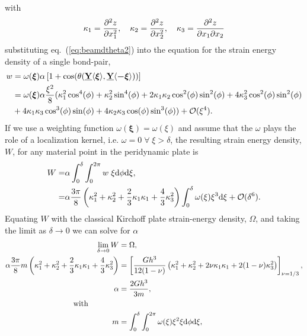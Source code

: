 \documentclass[preprint,review,12pt]{elsarticle}
\newcommand\vstate[3]{%
	\mathbf{\underline{#1}}%
	\ifstrempty{#2}{}{[#2]}%
	\ifstrempty{#3}{}{\langle #3 \rangle}}
\begin{document}
%
with
%
\begin{equation}
    \kappa_1=\frac{\partial^2 z}{\partial x_1^2}, \quad \kappa_2= \frac{\partial^2 z}{\partial x_2^2}, \quad \kappa_3=\frac{\partial^2 z}{\partial x_1\partial x_2}\notag
\end{equation}
%
substituting eq.~(\ref{eq:beamdtheta2}) into the equation for the strain energy density of a single bond-pair,
%
\begin{align}
    w &= \omega(\boldsymbol{\xi}) \alpha \left[1+\cos(\theta(\vstate{Y}{}{\boldsymbol{\xi}},\vstate{Y}{}{\boldsymbol{-\xi}}) ) \right] \notag \\
    &= \omega(\boldsymbol{\xi}) \alpha\frac{\xi^2}{8}(\kappa_1^2\cos^4(\phi)+\kappa_2^2\sin^4(\phi)+2\kappa_1\kappa_2\cos^2(\phi)\sin^2(\phi)+4\kappa_3^2\cos^2(\phi)\sin^2(\phi) \notag \\
    &+ 4\kappa_1\kappa_3\cos^3(\phi)\sin(\phi)+4\kappa_2\kappa_3\cos(\phi)\sin^3(\phi))+\mathcal{O}(\xi^4).\notag
\end{align}
%
If we use a weighting function \(\omega(\boldsymbol{\xi})=\omega(\xi)\) and assume that the $\omega$ plays the role of a localization kernel, i.e. $\omega = 0 \; \forall \; \xi > \delta$, the resulting strain energy density, $W$, for any material point in the peridynamic plate is
%
\begin{align}
    W =& \alpha \int_{0}^\delta\int_0^{2 \pi} w\; \xi {\rm d}\phi {\rm d}\xi ,\notag \\
    =& \alpha \frac{3\pi}{8} \left(\kappa_1^2+\kappa_2^2+\frac{2}{3}\kappa_1\kappa_1+\frac{4}{3}\kappa_3^2 \right)\int_{0}^\delta \omega(\xi)\xi^3{\rm d}\xi + \mathcal{O}(\delta^6).\notag 
\end{align}
%
Equating $W$ with the classical Kirchoff plate strain-energy density, $\Omega$, and taking the limit as $\delta \to 0$ we can solve for $\alpha$
%
\begin{align}
    \lim_{\delta \to 0}  W &= \Omega, \notag \\
    \alpha \frac{3 \pi}{8} m \left(\kappa_1^2+\kappa_2^2+\frac{2}{3}\kappa_1\kappa_1+\frac{4}{3}\kappa_3^2 \right)&= \left[ \frac{G h^3}{12(1-\nu)} \left(\kappa_1^2+\kappa_2^2+2\nu\kappa_1\kappa_1+2(1-\nu)\kappa_3^2 \right) \right]_{\nu=1/3}, \notag \\
    \alpha &= \frac{2 G h^3}{3 m}, \\
    \text{with}\qquad \qquad \notag \\
    \label{eq:alpha}
    m &= \int_{0}^{\delta} \int_{0}^{2\pi}\omega(\xi) \xi^2 \xi {\rm d}\phi {\rm d}\xi \notag,
\end{align}
\end{document}
